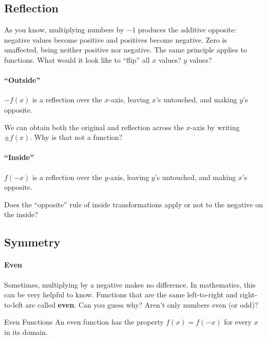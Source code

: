 \subsection{Reflection}




As you know, multiplying numbers by $-1$ produces the additive opposite: negative values
become positive and positives become negative.  Zero is unaffected, being neither positive
nor negative.  The same principle applies to functions.  What would it look like to ``flip'' all
$x$ values?  $y$ values?

\paragraph{``Outside''}
$-f(x)$ is a reflection over the $x$-axis, leaving $x$'s untouched, and making $y$'s opposite.

We can obtain both the original and reflection across the $x$-axis by writing $\pm f(x)$.  Why
is that not a function?

\paragraph{``Inside''}
$f(-x)$ is a reflection over the $y$-axis, leaving $y$'s untouched, and making $x$'s opposite.

Does the ``opposite'' rule of inside transformations apply or not to the negative on the inside?


\subsection{Symmetry}
\paragraph{Even}
Sometimes, multiplying by a negative makes no difference.  In mathematics, this can be very 
helpful to know.  Functions that are the same left-to-right and right-to-left are called \textbf{even}.
Can you guess why?  Aren't only numbers even (or odd)?



\begin{derivation}{Even Functions}
An even function has the property $f(x)=f(-x)$ for every $x$ in its domain.
\end{derivation}



